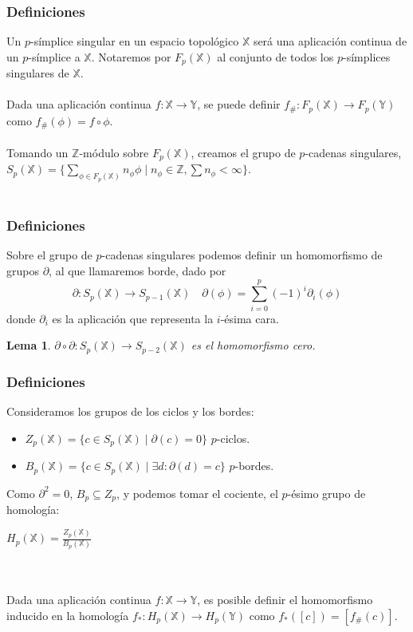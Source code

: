 \documentclass{beamer}
\def\X{{\mathbb X}}
\def\Y{{\mathbb Y}}
\theoremstyle{theorem}
\newtheorem{mylemma}{Lema}
\begin{document}

\begin{frame}
  \frametitle{Definiciones}
  Un $p$-símplice singular en un espacio topológico $\X$ será una aplicación continua de un $p$-símplice a $\X$.
  Notaremos por $F_p(\X)$ al conjunto de todos los $p$-símplices singulares de $\X$. \\~\\

  Dada una aplicación continua $f \colon \X \to \Y$, se puede definir $f_\# \colon F_p(\X) \to F_p(\Y)$ como
  $f_\#(\phi) = f \circ \phi$. \\~\\

  Tomando un $\mathbb{Z}$-módulo sobre $F_p(\X)$, creamos el grupo de $p$-cadenas singulares,
  $S_p(\X) = \{\sum\limits_{\phi \in F_p(\X)} n_{\phi} \phi \mid n_{\phi} \in \mathbb Z,  \sum n_\phi < \infty\}$.
  \\~\\


\end{frame}

\begin{frame}
  \frametitle{Definiciones}
  Sobre el grupo de $p$-cadenas singulares podemos definir un homomorfismo de grupos $\partial$, al que llamaremos borde, dado por
  \[ \partial \colon S_p(\X) \to S_{p-1}(\X) \quad \partial(\phi) = \sum\limits_{i = 0}^p (-1)^i \partial_i(\phi) \]
  donde $\partial_i$ es la aplicación que representa la $i$-ésima cara.

  \begin{mylemma}
      $\partial \circ \partial \colon S_p(\X) \to S_{p-2}(\X)$ es el homomorfismo cero.
  \end{mylemma}

\end{frame}


\begin{frame}
  \frametitle{Definiciones}
  Consideramos los grupos de los ciclos y los bordes:
  \begin{itemize}
    \item $Z_p(\X) = \{c \in S_p(\X) \mid \partial(c) = 0\}$ $p$-ciclos.
    \item $B_p(\X) = \{c \in S_p(\X) \mid \exists d \colon \partial(d) = c\}$ $p$-bordes.
  \end{itemize}

  Como $\partial^2 = 0$, $B_p \subseteq Z_p$, y podemos tomar el cociente, el $p$-ésimo grupo de homología:
  \centerline{$H_p(\X) = \frac{Z_p(\X)}{B_p(\X)}$} \\~\\

  Dada una aplicación continua $f \colon \X \to \Y$, es posible definir el homomorfismo inducido en
  la homología $f_* \colon H_p(\X) \to H_p(\Y)$ como $f_*([c]) = [f_\#(c)]$.

\end{frame}
\end{document}
